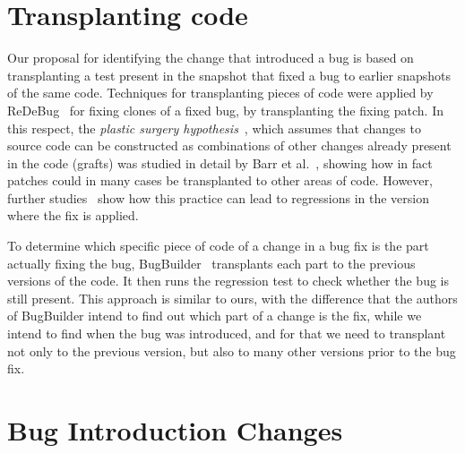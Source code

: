 \section{Transplanting code}
\label{sec:transplating-code:related}

Our proposal for identifying the change that introduced a bug is based on transplanting a test present in the snapshot that fixed a bug to earlier snapshots of the same code. Techniques for transplanting pieces of code were applied by ReDeBug~\cite{jang2012redebug} for fixing clones of a fixed bug, by transplanting the fixing patch. In this respect, the \emph{plastic surgery hypothesis}~\cite{harman2010:automated_patching}, which assumes that changes to source code can be constructed as combinations of other changes already present in the code (grafts) was studied in detail by Barr et al.~\cite{barr2014plastic}, showing how in fact patches could in many cases be transplanted to other areas of code. However, further studies~\cite{castelluccio2019empirical} show how this practice can lead to regressions in the version where the fix is applied.

To determine which specific piece of code of a change in a bug fix is the part actually fixing the bug, BugBuilder~\cite{jiang2021extracting} transplants each part to the previous versions of the code. It then runs the regression test to check whether the bug is still present. This approach is similar to ours, with the difference that the authors of BugBuilder intend to find out which part of a change is the fix, while we intend to find when the bug was introduced, and for that we need to transplant not only to the previous version, but also to many other versions prior to the bug fix.

\section{Bug Introduction Changes}
\label{sec:bic:related}

